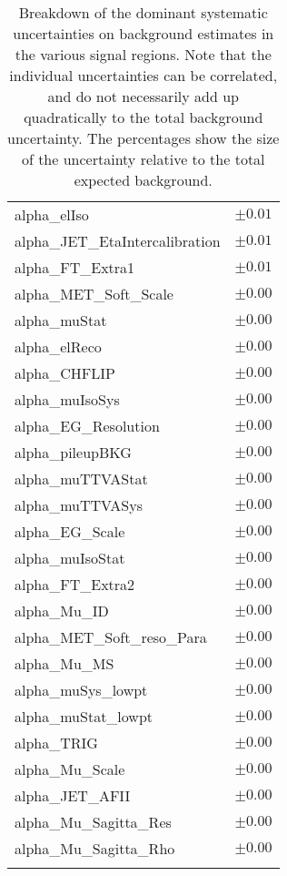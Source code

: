 \begin{table}
\begin{center}
\begin{tabular*}{\textwidth}{@{\extracolsep{\fill}}lc}
alpha\_elIso         & $\pm 0.01$       \\
alpha\_JET\_EtaIntercalibration         & $\pm 0.01$       \\
alpha\_FT\_Extra1         & $\pm 0.01$       \\
alpha\_MET\_Soft\_Scale         & $\pm 0.00$       \\
alpha\_muStat         & $\pm 0.00$       \\
alpha\_elReco         & $\pm 0.00$       \\
alpha\_CHFLIP         & $\pm 0.00$       \\
alpha\_muIsoSys         & $\pm 0.00$       \\
alpha\_EG\_Resolution         & $\pm 0.00$       \\
alpha\_pileupBKG         & $\pm 0.00$       \\
alpha\_muTTVAStat         & $\pm 0.00$       \\
alpha\_muTTVASys         & $\pm 0.00$       \\
alpha\_EG\_Scale         & $\pm 0.00$       \\
alpha\_muIsoStat         & $\pm 0.00$       \\
alpha\_FT\_Extra2         & $\pm 0.00$       \\
alpha\_Mu\_ID         & $\pm 0.00$       \\
alpha\_MET\_Soft\_reso\_Para         & $\pm 0.00$       \\
alpha\_Mu\_MS         & $\pm 0.00$       \\
alpha\_muSys\_lowpt         & $\pm 0.00$       \\
alpha\_muStat\_lowpt         & $\pm 0.00$       \\
alpha\_TRIG         & $\pm 0.00$       \\
alpha\_Mu\_Scale         & $\pm 0.00$       \\
alpha\_JET\_AFII         & $\pm 0.00$       \\
alpha\_Mu\_Sagitta\_Res         & $\pm 0.00$       \\
alpha\_Mu\_Sagitta\_Rho         & $\pm 0.00$       \\
\noalign{\smallskip}\hline\noalign{\smallskip}
\end{tabular*}
\end{center}
\caption[Breakdown of uncertainty on background estimates]{
Breakdown of the dominant systematic uncertainties on background estimates in the various signal regions.
Note that the individual uncertainties can be correlated, and do not necessarily add up quadratically to 
the total background uncertainty. The percentages show the size of the uncertainty relative to the total expected background.
\label{table.results.bkgestimate.uncertainties.Rpc2L0bH}}
\end{table}
\clearpage
%